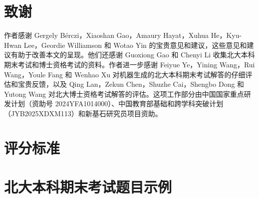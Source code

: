 \documentclass[11pt]{article}
\numberwithin{equation}{section}
\begin{document}
\section*{致谢}

作者感谢 Gergely Bérczi，Xiaoshan Gao，Amaury Hayat，Xuhua He，Kyu-Hwan Lee，Geordie Williamson 和 Wotao Yin 的宝贵意见和建议，这些意见和建议有助于改善本文的呈现。他们还感谢 Guoxiong Gao 和 Chenyi Li 收集北大本科期末考试和博士资格考试的资料。作者进一步感谢 Feiyue Ye，Yining Wang，Rui Wang，Youle Fang 和 Wenhao Xu 对机器生成的北大本科期末考试解答的仔细评估和宝贵反馈，以及 Qing Lan，Zekun Chen，Shuzhe Cai，Shengbo Dong 和 Yutong Wang 对北大博士资格考试解答的评估。这项工作部分由中国国家重点研发计划（资助号 2024YFA1014000）、中国教育部基础和跨学科突破计划（JYB2025XDXM113）和新基石研究员项目资助。




\newpage
\appendix

\section{评分标准}

\begin{table}[h]
\label{tab:score_crtr}
\centering
{}
\caption{本科考试的评分标准。}
\end{table}

\section{北大本科期末考试题目示例}\label{sec:exam}

\end{document}
